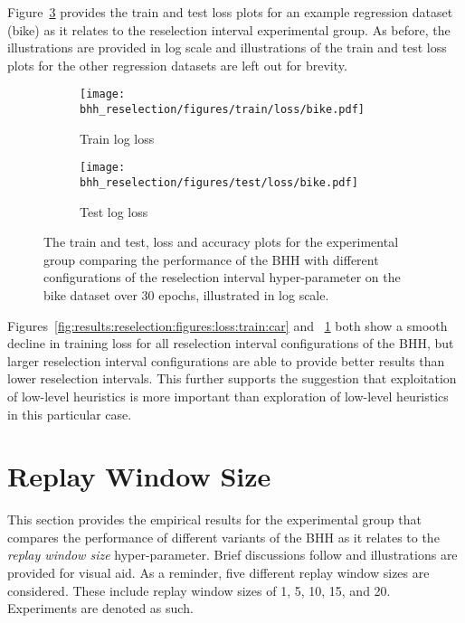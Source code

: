 Figure~\ref{fig:results:reselection:figures:bike} provides the train and test loss plots for an example regression dataset (bike) as it relates to the reselection interval experimental group. As before, the illustrations are provided in log scale and illustrations of the train and test loss plots for the other regression datasets are left out for brevity.

\begin{figure}[htbp]
	\begin{subfigure}{0.5\textwidth}
		\centering
		\texttt{[image: bhh\_reselection/figures/train/loss/bike.pdf]}
		\caption{Train log loss}
		\label{fig:results:reselection:figures:loss:train:bike}
	\end{subfigure}
	\begin{subfigure}{0.5\textwidth}
		\centering
		\texttt{[image: bhh\_reselection/figures/test/loss/bike.pdf]}
		\caption{Test log loss}
		\label{fig:results:reselection:figures:loss:test:bike}
	\end{subfigure}
	\par\bigskip
	\caption{The train and test, loss and accuracy plots for the experimental group comparing the performance of the \acs{BHH} with different configurations of the reselection interval hyper-parameter on the bike dataset over 30 epochs, illustrated in log scale.}
	\label{fig:results:reselection:figures:bike}
\end{figure}

Figures~\ref{fig:results:reselection:figures:loss:train:car} and ~\ref{fig:results:reselection:figures:loss:train:bike} both show a smooth decline in training loss for all reselection interval configurations of the \acs{BHH}, but larger reselection interval configurations are able to provide better results than lower reselection intervals. This further supports the suggestion that exploitation of low-level heuristics is more important than exploration of low-level heuristics in this particular case.

\section{Replay Window Size}\label{sec:results:replay}

This section provides the empirical results for the experimental group that compares the performance of different variants of the \acs{BHH} as it relates to the \textit{replay window size} hyper-parameter. Brief discussions follow and illustrations are provided for visual aid. As a reminder, five different replay window sizes are considered. These include replay window sizes of 1, 5, 10, 15, and 20. Experiments are denoted as such.

